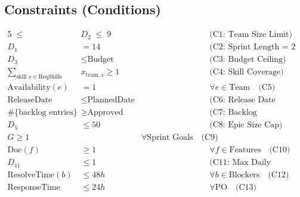 \documentclass{article}
\begin{document}
\subsection*{Constraints (Conditions)}
\begin{align}
5 \;\le\; & D_2 \;\le\; 9 && \text{(C1: Team Size Limit)} \\
D_1 &= 14 && \text{(C2: Sprint Length = 2 weeks)} \\
D_3 &\le \text{Budget} && \text{(C3: Budget Ceiling)} \\
\sum_{\text{skill } s \in \text{ReqSkills}} & x_{\text{team},s} \ge 1 && \text{(C4: Skill Coverage)} \\
\text{Availability}(e) &= 1 && \forall e \in \text{Team} \quad \text{(C5)} \\
\text{ReleaseDate} &\le \text{PlannedDate} && \text{(C6: Release Date Target)} \\
\#\{\text{backlog entries}\} &\ge \text{Approved} && \text{(C7: Backlog Completeness)} \\
D_5 &\le 50 && \text{(C8: Epic Size Cap)} \\
G \ge 1 && \forall \text{Sprint Goals} \quad \text{(C9)} \\
\text{Doc}(f) &\ge 1 && \forall f \in \text{Features} \quad \text{(C10)} \\
D_{11} &\le 1 && \text{(C11: Max Daily Meetings)} \\
\text{ResolveTime}(b) &\le 48h && \forall b \in \text{Blockers} \quad \text{(C12)} \\
\text{ResponseTime} &\le 24h && \forall \text{PO} \quad \text{(C13)}
\end{align}
\end{document}
